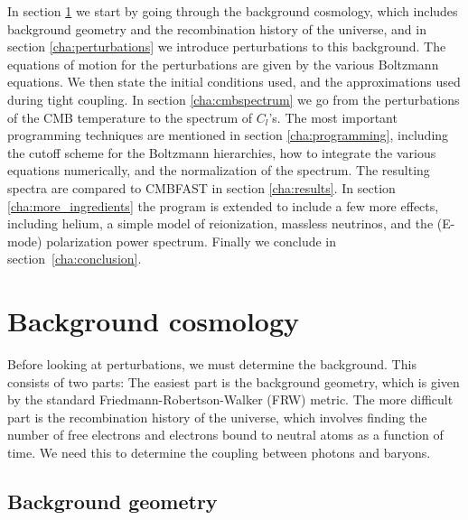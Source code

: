 \documentclass[twocolumn,nofootinbib,amsmath,amssymb]{revtex4}
\begin{document}
In section \ref{cha:background} we start by going through the background
cosmology, which includes background geometry and the recombination history of
the universe, and in section \ref{cha:perturbations} we introduce perturbations
to this background. The equations of motion for the perturbations are given by
the various Boltzmann equations. We then state the initial conditions used, and
the approximations used during tight coupling. In section \ref{cha:cmbspectrum}
we go from the perturbations of the CMB temperature to the spectrum of $C_l$'s.
The most important programming techniques are mentioned in section
\ref{cha:programming}, including the cutoff scheme for the Boltzmann
hierarchies, how to integrate the various equations numerically, and the
normalization of the spectrum. The resulting spectra are compared to CMBFAST in
section \ref{cha:results}. In section \ref{cha:more_ingredients} the program is
extended to include a few more effects, including helium, a simple model of
reionization, massless neutrinos, and the (E-mode) polarization power spectrum.
Finally we conclude in section~\ref{cha:conclusion}.


\section{Background cosmology}
\label{cha:background}

Before looking at perturbations, we must determine the background. This
consists of two parts: The easiest part is the background geometry, which is
given by the standard Friedmann-Robertson-Walker (FRW) metric. The more
difficult part is the recombination history of the universe, which involves
finding the number of free electrons and electrons bound to neutral atoms as a
function of time. We need this to determine the coupling between photons and
baryons.


\subsection{Background geometry}
\end{document}
